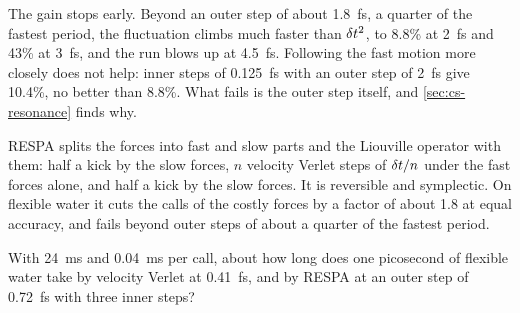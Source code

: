 The gain stops early. Beyond an outer step of about
\SI{1.8}{\femto\second}, a quarter of the fastest period, the fluctuation
climbs much faster than $\delta t^2$, to 8.8\% at \SI{2}{\femto\second} and
43\% at \SI{3}{\femto\second}, and the run blows up at
\SI{4.5}{\femto\second}. Following the fast motion more closely does not
help: inner steps of \SI{0.125}{\femto\second} with an outer step of
\SI{2}{\femto\second} give 10.4\%, no better than 8.8\%. What fails is
the outer step itself, and \cref{sec:cs-resonance} finds why.

\begin{keyidea}
RESPA splits the forces into fast and slow parts and the Liouville
operator with them: half a kick by the slow forces, $n$ velocity Verlet
steps of $\delta t/n$ under the fast forces alone, and half a kick by the slow
forces. It is reversible and symplectic. On flexible water it cuts the
calls of the costly forces by a factor of about 1.8 at equal accuracy, and
fails beyond outer steps of about a quarter of the fastest period.
\end{keyidea}


\begin{selfcheck}
With \SI{24}{\milli\second} and \SI{0.04}{\milli\second} per call, about how long does one picosecond of
flexible water take by velocity Verlet at \SI{0.41}{\femto\second}, and by
RESPA at an outer step of \SI{0.72}{\femto\second} with three inner
steps?
\end{selfcheck}
